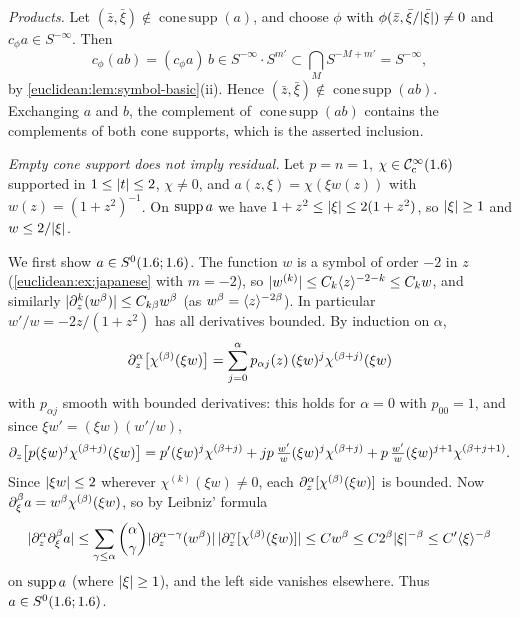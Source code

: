 \emph{Products.} Let $(\bar z,\bar\xi)\notin\operatorname{cone\,supp}(a)$, and choose
$\phi$ with $\phi(\bar z,\bar\xi/\lvert \bar\xi\rvert)\ne0$ and $c_\phi a\in S^{-\infty}$. Then
\begin{equation*}
  c_\phi(ab)=(c_\phi a)\,b\in S^{-\infty}\cdot S^{m'}\subset\bigcap_MS^{-M+m'}=S^{-\infty},
\end{equation*}
by \cref{euclidean:lem:symbol-basic}(ii). Hence
$(\bar z,\bar\xi)\notin\operatorname{cone\,supp}(ab)$. Exchanging $a$ and $b$, the
complement of $\operatorname{cone\,supp}(ab)$ contains the complements of both cone
supports, which is the asserted inclusion.

\emph{Empty cone support does not imply residual.} Let $p=n=1$, $\chi\in\mathcal{C}^\infty_{\mathrm{c}}(1.6)$
supported in $1\le\lvert t\rvert\le2$, $\chi\ne0$, and $a(z,\xi)=\chi(\xi w(z))$ with
$w(z)=(1+z^2)^{-1}$. On $\operatorname{supp} a$ we have $1+z^2\le\lvert \xi\rvert\le2(1+z^2)$, so $\lvert \xi\rvert\ge1$
and $w\le2/\lvert \xi\rvert$.

We first show $a\in S^0(1.6;1.6)$. The function $w$ is a symbol of order $-2$ in $z$
(\cref{euclidean:ex:japanese} with $m=-2$), so $\lvert w^{(k)}\rvert\le C_k\langle z\rangle^{-2-k}\le C_kw$,
and similarly $\lvert \partial^k_z(w^\beta)\rvert\le C_{k\beta}w^\beta$ (as $w^\beta=\langle z\rangle^{-2\beta}$). In
particular $w'/w=-2z/(1+z^2)$ has all derivatives bounded. By induction on $\alpha$,
\begin{equation*}
  \partial^\alpha_z\bigl[\chi^{(\beta)}(\xi w)\bigr]=\sum_{j=0}^{\alpha}p_{\alpha j}(z)\,(\xi w)^j\chi^{(\beta+j)}(\xi w)
\end{equation*}
with $p_{\alpha j}$ smooth with bounded derivatives: this holds for $\alpha=0$ with
$p_{00}=1$, and since $\xi w'=(\xi w)(w'/w)$,
\begin{equation*}
  \partial_z\bigl[p(\xi w)^j\chi^{(\beta+j)}(\xi w)\bigr]
  =p'(\xi w)^j\chi^{(\beta+j)}+jp\,\tfrac{w'}w(\xi w)^j\chi^{(\beta+j)}
  +p\,\tfrac{w'}w(\xi w)^{j+1}\chi^{(\beta+j+1)}.
\end{equation*}
Since $\lvert \xi w\rvert\le2$ wherever $\chi^{(k)}(\xi w)\ne0$, each $\partial^\alpha_z[\chi^{(\beta)}(\xi w)]$
is bounded. Now $\partial^\beta_\xi a=w^\beta\chi^{(\beta)}(\xi w)$, so by Leibniz' formula
\begin{equation*}
  \lvert \partial^\alpha_z\partial^\beta_\xi a\rvert\le\sum_{\gamma\le\alpha}\binom\alpha\gamma
  \lvert \partial^{\alpha-\gamma}_z(w^\beta)\rvert\,\lvert \partial^\gamma_z[\chi^{(\beta)}(\xi w)]\rvert
  \le Cw^\beta\le C2^\beta\lvert \xi\rvert^{-\beta}\le C'\langle \xi\rangle^{-\beta}
\end{equation*}
on $\operatorname{supp} a$ (where $\lvert \xi\rvert\ge1$), and the left side vanishes elsewhere. Thus
$a\in S^0(1.6;1.6)$.

